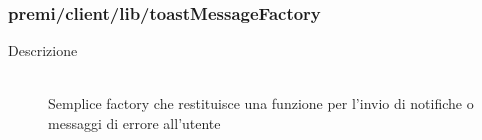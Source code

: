\subsubsection{premi/client/lib/toastMessageFactory}

\begin{description}
\item[Descrizione] \hfill \\
	Semplice factory che restituisce una funzione per l'invio di notifiche o messaggi di errore all'utente
\end{description}

